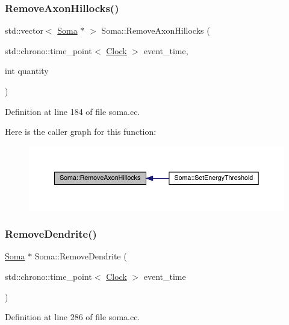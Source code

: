 \subsubsection{\texorpdfstring{Remove\+Axon\+Hillocks()}{RemoveAxonHillocks()}}
{\footnotesize\ttfamily std\+::vector$<$ \hyperlink{class_soma}{Soma} $\ast$ $>$ Soma\+::\+Remove\+Axon\+Hillocks (\begin{DoxyParamCaption}\item[{std\+::chrono\+::time\+\_\+point$<$ \hyperlink{universe_8h_a0ef8d951d1ca5ab3cfaf7ab4c7a6fd80}{Clock} $>$}]{event\+\_\+time,  }\item[{int}]{quantity }\end{DoxyParamCaption})}



Definition at line 184 of file soma.\+cc.

Here is the caller graph for this function\+:
\nopagebreak
\begin{figure}[H]
\begin{center}
\leavevmode
\includegraphics[width=350pt]{class_soma_a7281585d74015a2549a19df6cb16e3fb_icgraph}
\end{center}
\end{figure}
\mbox{\label{class_soma_a85c7d4b41486182c9528f5c43beaf7fd}} 
\subsubsection{\texorpdfstring{Remove\+Dendrite()}{RemoveDendrite()}}
{\footnotesize\ttfamily \hyperlink{class_soma}{Soma} $\ast$ Soma\+::\+Remove\+Dendrite (\begin{DoxyParamCaption}\item[{std\+::chrono\+::time\+\_\+point$<$ \hyperlink{universe_8h_a0ef8d951d1ca5ab3cfaf7ab4c7a6fd80}{Clock} $>$}]{event\+\_\+time }\end{DoxyParamCaption})}



Definition at line 286 of file soma.\+cc.

